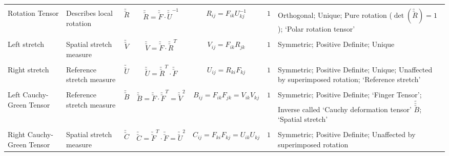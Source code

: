 \documentclass[10pt]{article}
\newcommand{\tuu}[1]{\utilde{\utilde{#1}}}
\begin{document}
\begin{center}
\begin{tabular}{l m{3in} c c c c m{5in}}
%
\hline
\\[-1ex]
Rotation Tensor
&%
Describes local rotation
&%
$ \tuu{R} $
&%
$ \tuu{R} = \tuu{F} \cdot \tuu{U}^{-1} $
&%
$ R_{ij} = F_{ik} U^{-1}_{kj} $
&%
$ 1 $
&%
Orthogonal; Unique; Pure rotation ($\det(\tuu{R}) = 1$); `Polar rotation tensor'
\\[1ex]




%
\hline
\\[-1ex]
Left stretch
&%
Spatial stretch measure
&%
$ \tuu{V} $
&%
$ \tuu{V} = \tuu{F} \cdot \tuu{R}^{T} $
&%
$ V_{ij} = F_{ik} R_{jk} $
&%
$ 1 $
&%
Symmetric; Positive Definite; Unique
\\[1ex]



%
\hline
\\[-1ex]
Right stretch
&%
Reference stretch measure
&%
$ \tuu{U} $
&%
$ \tuu{U} = \tuu{R}^{T} \cdot \tuu{F} $
&%
$ U_{ij} = R_{ki} F_{kj} $
&%
$ 1 $
&%
Symmetric; Positive Definite; Unique; Unaffected by superimposed rotation; `Reference stretch'
\\[1ex]

%
\hline
\\[-1ex]
Left Cauchy-Green Tensor
&%
Reference stretch measure
&%
$ \tuu{B} $
&%
$ \tuu{B} = \tuu{F} \cdot \tuu{F}^{T} = \tuu{V}^{2}$
&%
$ B_{ij} = F_{ik} F_{jk} = V_{ik} V_{kj}$
&%
$ 1 $
&%
Symmetric; Positive Definite; `Finger Tensor'; Inverse called `Cauchy deformation tensor' $\tilde{\tuu{B}}$; `Spatial stretch'
\\[1ex]




\hline
\\[-1ex]
Right Cauchy-Green Tensor
&%
Spatial stretch measure
&%
$ \tuu{C} $
&%
$ \tuu{C} = \tuu{F}^{T} \cdot \tuu{F} = \tuu{U}^{2}$
&%
$ C_{ij} = F_{ki} F_{kj} = U_{ik} U_{kj}$
&%
$ 1 $
&%
Symmetric; Positive Definite; Unaffected by superimposed rotation
\\[1ex]



\end{tabular}
\end{center}
\end{document}
